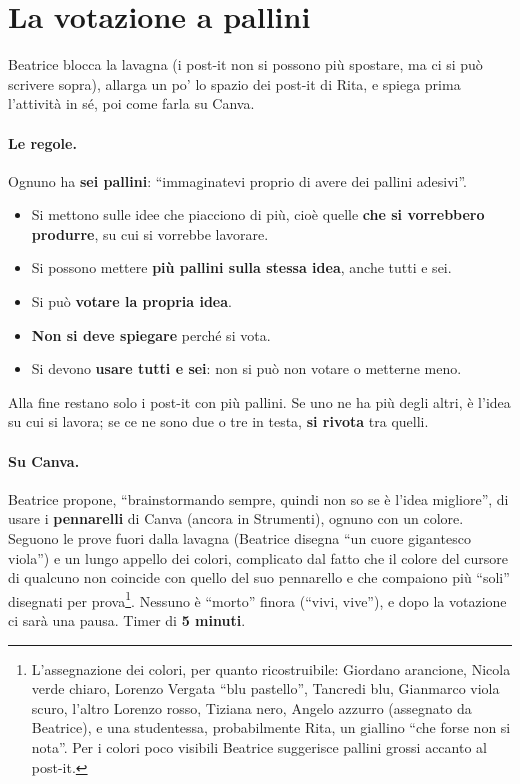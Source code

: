 \section{La votazione a pallini}
\label{a7:sec:votazione}

Beatrice blocca la lavagna (i post-it non si possono più spostare, ma ci si può
scrivere sopra), allarga un po' lo spazio dei post-it di Rita, e spiega prima
l'attività in sé, poi come farla su Canva.

\paragraph{Le regole.} Ognuno ha \textbf{sei pallini}: ``immaginatevi proprio di avere
dei pallini adesivi''.
\begin{itemize}
  \item Si mettono sulle idee che piacciono di più, cioè quelle \textbf{che si
        vorrebbero produrre}, su cui si vorrebbe lavorare.
  \item Si possono mettere \textbf{più pallini sulla stessa idea}, anche tutti e sei.
  \item Si può \textbf{votare la propria idea}.
  \item \textbf{Non si deve spiegare} perché si vota.
  \item Si devono \textbf{usare tutti e sei}: non si può non votare o metterne meno.
\end{itemize}
Alla fine restano solo i post-it con più pallini. Se uno ne ha più degli altri, è
l'idea su cui si lavora; se ce ne sono due o tre in testa, \textbf{si rivota} tra
quelli.

\paragraph{Su Canva.} Beatrice propone, ``brainstormando sempre, quindi non so se è
l'idea migliore'', di usare i \textbf{pennarelli} di Canva (ancora in Strumenti),
ognuno con un colore. Seguono le prove fuori dalla lavagna (Beatrice disegna ``un
cuore gigantesco viola'') e un lungo appello dei colori, complicato dal fatto che il
colore del cursore di qualcuno non coincide con quello del suo pennarello e che
compaiono più ``soli'' disegnati per prova\footnote{L'assegnazione dei colori, per
quanto ricostruibile: Giordano arancione, Nicola verde chiaro, Lorenzo Vergata ``blu
pastello'', Tancredi blu, Gianmarco viola scuro, l'altro Lorenzo rosso, Tiziana nero,
Angelo azzurro (assegnato da Beatrice), e una studentessa, probabilmente Rita, un
giallino ``che forse non si nota''. Per i colori poco visibili Beatrice suggerisce
pallini grossi accanto al post-it.}. Nessuno è ``morto'' finora (``vivi, vive''), e
dopo la votazione ci sarà una pausa. Timer di \textbf{5 minuti}.

